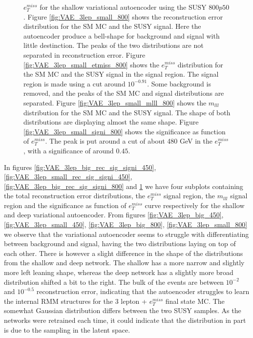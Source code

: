 \begin{figure}[H]
{    $e_T^{miss}$ for the shallow variational autoencoder using the SUSY $800p50$.
    Figure \ref{fig:VAE_3lep_small_800} shows the reconstruction error 
    distribution for the SM MC and the SUSY signal. Here the autoencoder produce a bell-shape for background and 
    signal with little destinction. The peaks of the two distributions are not separated in reconstruction error. Figure \ref{fig:VAE_3lep_small_etmiss_800} 
    shows the $e_T^{miss}$ distribution for the SM MC and the SUSY signal in the signal region. 
    The signal region is made using a cut around $10^{-0.91}$. Some background is removed, and the peaks of the SM MC and signal 
    distributions are separated. Figure \ref{fig:VAE_3lep_small_mlll_800} shows the $m_{lll}$ distribution for the SM MC and the SUSY signal. 
    The shape of both distributions are displaying almost the same shape. Figure \ref{fig:VAE_3lep_small_signi_800} shows the significance as 
    function of $e_T^{miss}$. The peak is put around a cut of about 480 GeV in the $e_T^{miss}$, with a significance of around $0.45$.}
    \label{fig:VAE_3lep_small_rec_sig_signi_800}
\end{figure}


In figures \ref{fig:VAE_3lep_big_rec_sig_signi_450}, \ref{fig:VAE_3lep_small_rec_sig_signi_450}, 
\ref{fig:VAE_3lep_big_rec_sig_signi_800} and \ref{fig:VAE_3lep_small_rec_sig_signi_800} we have four 
subplots containing the total reconstruction error distributions, the $e_T^{miss}$ signal region, 
the $m_{lll}$ signal region and the significance as function of $e_T^{miss}$ curve respectively for 
the shallow and deep variational autoencoder. From figures \ref{fig:VAE_3lep_big_450}, \ref{fig:VAE_3lep_small_450},
\ref{fig:VAE_3lep_big_800}, \ref{fig:VAE_3lep_small_800} we observe that the variational 
autoencoder seems to struggle with differentiating between background and signal, having the 
two distributions laying on top of each other. There is however a slight difference in the 
shape of the distributions from the shallow and deep network. The shallow has a more narrow 
and slightly more left leaning shape, whereas the deep network has a slightly more broad 
distribution shifted a bit to the right. The bulk of the events are between $10^{-2}$ and $10^{-0.5}$ 
reconstruction error, indicating that the autoencoder struggles to learn  the internal RMM 
structures for the 3 lepton + $e_T^{miss}$ final state MC. The somewhat Gaussian distribution 
differs between the two SUSY samples. As the networks were retrained each time, it could indicate 
that the distribution in part is due to the sampling in the latent space. \par 

